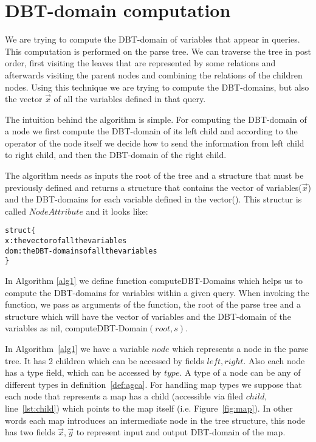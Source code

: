 \documentclass[12pt]{article}
\begin{document}
\section{DBT-domain computation}\label{DBT-domain}

We are trying to compute the DBT-domain of variables that appear in queries. This computation is performed on the parse tree. We can traverse the tree in post order, first visiting the leaves that are represented by some relations and afterwards visiting the parent nodes and combining the relations of the children nodes. Using this technique we are trying to compute the DBT-domains, but also the vector $\vec x$ of all the variables defined in that query.

The intuition behind the algorithm is simple. For computing the DBT-domain of a node we first compute the DBT-domain of its left child and according to the operator of the node itself we decide how to send the information from left child to right child, and then the DBT-domain of the right child.

The algorithm needs as inputs the root of the tree and a structure that must be previously defined and returns a structure that contains the vector of variables($\vec{x}$) and the DBT-domains for each variable defined in the vector(\dom). This structur is called $NodeAttribute$ and it looks like:

\begin{program}
\begin{alltt}
struct \{
x: the vector of all the variables 
dom: the DBT-domains of all the variables
\}
\end{alltt}
\caption{$NodeAttribute$}
\label{struct}
\end{program}
In Algorithm \ref{alg1} we define function \textsf{computeDBT-Domains} which helps us to compute the DBT-domains for variables within a given query. When invoking the function, we pass as arguments of the function, the root of the parse tree and a structure which will have the vector of variables and the DBT-domain of the variables as nil, \textsf{computeDBT-Domain}$(root,s)$.
\par
In Algorithm~\ref{alg1} we have a variable $node$ which represents a node in the parse tree. It has 2 children which can be accessed by fields $left, right$. Also each node has a type field, which can be accessed by $type$. A type of a node can be any of different types in definition~\eqref{def:agca}. For handling map types we suppose that each node that represents a map has a child (accessible via filed $child$, line~\ref{lst:child}) which points to the map itself (i.e. Figure~\ref{fig:map}). In other words each map introduces an intermediate node in the tree structure, this node has two fields $\vec{x},\vec{y}$ to represent input and output DBT-domain of the map. 
\end{document}
